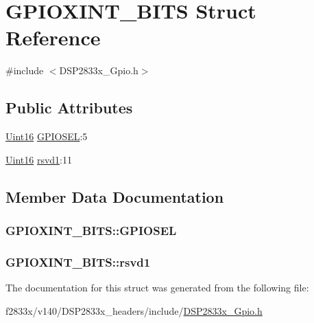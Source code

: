 \hypertarget{struct_g_p_i_o_x_i_n_t___b_i_t_s}{}\section{G\+P\+I\+O\+X\+I\+N\+T\+\_\+\+B\+I\+T\+S Struct Reference}
\label{struct_g_p_i_o_x_i_n_t___b_i_t_s}


{\ttfamily \#include $<$D\+S\+P2833x\+\_\+\+Gpio.\+h$>$}

\subsection*{Public Attributes}
\begin{DoxyCompactItemize}
\item 
\hyperlink{_d_s_p2833x___device_8h_a59a9f6be4562c327cbfb4f7e8e18f08b}{Uint16} \hyperlink{struct_g_p_i_o_x_i_n_t___b_i_t_s_a0eeb47a8aecc2cc436fe8e14e261ede4}{G\+P\+I\+O\+S\+E\+L}\+:5
\item 
\hyperlink{_d_s_p2833x___device_8h_a59a9f6be4562c327cbfb4f7e8e18f08b}{Uint16} \hyperlink{struct_g_p_i_o_x_i_n_t___b_i_t_s_aa460c9e58914bcc6398f172662e232c1}{rsvd1}\+:11
\end{DoxyCompactItemize}


\subsection{Member Data Documentation}
\hypertarget{struct_g_p_i_o_x_i_n_t___b_i_t_s_a0eeb47a8aecc2cc436fe8e14e261ede4}{}
\subsubsection[{G\+P\+I\+O\+S\+E\+L}]{ G\+P\+I\+O\+X\+I\+N\+T\+\_\+\+B\+I\+T\+S\+::\+G\+P\+I\+O\+S\+E\+L}\label{struct_g_p_i_o_x_i_n_t___b_i_t_s_a0eeb47a8aecc2cc436fe8e14e261ede4}
\hypertarget{struct_g_p_i_o_x_i_n_t___b_i_t_s_aa460c9e58914bcc6398f172662e232c1}{}
\subsubsection[{rsvd1}]{ G\+P\+I\+O\+X\+I\+N\+T\+\_\+\+B\+I\+T\+S\+::rsvd1}\label{struct_g_p_i_o_x_i_n_t___b_i_t_s_aa460c9e58914bcc6398f172662e232c1}


The documentation for this struct was generated from the following file\+:\begin{DoxyCompactItemize}
\item 
f2833x/v140/\+D\+S\+P2833x\+\_\+headers/include/\hyperlink{_d_s_p2833x___gpio_8h}{D\+S\+P2833x\+\_\+\+Gpio.\+h}\end{DoxyCompactItemize}
